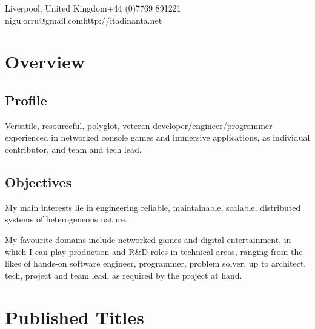 \documentclass[a4paper,10pt]{article}
\begin{document}
    {Liverpool, United Kingdom}{+44 (0)7769 891221}
    {nigu.orru@gmail.com}{http://itadinanta.net}


    \section{Overview}

        \subsection{Profile}
            Versatile, resourceful, polyglot, veteran developer/engineer/programmer experienced in networked console
            games and immersive applications, as individual contributor, and team and tech lead.

        \subsection{Objectives}
            My main interests lie in engineering reliable, maintainable, scalable, distributed systems of
            heterogeneous nature. \vspace{0.25em}

            My favourite domains include networked games and digital entertainment, in which I can play production
            and R\&D roles in technical areas, ranging from the likes of hands-on software engineer, programmer,
            problem solver, up to architect, tech, project and team lead, as required by the project at hand.


    \section{Published Titles}
\end{document}
